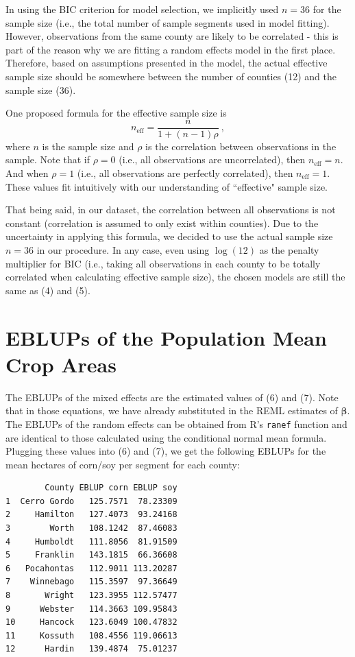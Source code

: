 \documentclass{article}
\begin{document}
In using the BIC criterion for model selection, we implicitly used $n=36$ for the sample size (i.e., the total number of sample segments used in model fitting). However, observations from the same county are likely to be correlated - this is part of the reason why we are fitting a random effects model in the first place. Therefore, based on assumptions presented in the model, the actual effective sample size should be somewhere between the number of counties (12) and the sample size (36). 
\medbreak

One proposed formula \cite{effsize} for the effective sample size is
\begin{equation}
n_\text{eff} = \frac{n}{1+(n-1)\rho}\ ,
\end{equation}
where $n$ is the sample size and $\rho$ is the correlation between observations in the sample. Note that if $\rho=0$ (i.e., all observations are uncorrelated), then $n_\text{eff}=n$. And when $\rho=1$ (i.e., all observations are perfectly correlated), then $n_\text{eff}=1$. These values fit intuitively with our understanding of ``effective" sample size.
\medbreak

That being said, in our dataset, the correlation between all observations is not constant (correlation is assumed to only exist within counties). Due to the uncertainty in applying this formula, we decided to use the actual sample size $n=36$ in our procedure. In any case, even using $\log(12)$ as the penalty multiplier for BIC (i.e., taking all observations in each county to be totally correlated when calculating effective sample size), the chosen models are still the same as (4) and (5).

\section{EBLUPs of the Population Mean Crop Areas}

The EBLUPs of the mixed effects are the estimated values of (6) and (7). Note that in those equations, we have already substituted in the REML estimates of $\boldsymbol\beta$. The EBLUPs of the random effects can be obtained from R's \texttt{ranef} function and are identical to those calculated using the conditional normal mean formula. Plugging these values into (6) and (7), we get the following EBLUPs for the mean hectares of corn/soy per segment for each county:

\begin{verbatim}
        County EBLUP corn EBLUP soy
1  Cerro Gordo   125.7571  78.23309
2     Hamilton   127.4073  93.24168
3        Worth   108.1242  87.46083
4     Humboldt   111.8056  81.91509
5     Franklin   143.1815  66.36608
6   Pocahontas   112.9011 113.20287
7    Winnebago   115.3597  97.36649
8       Wright   123.3955 112.57477
9      Webster   114.3663 109.95843
10     Hancock   123.6049 100.47832
11     Kossuth   108.4556 119.06613
12      Hardin   139.4874  75.01237
\end{verbatim}
\end{document}
